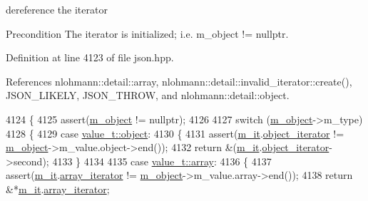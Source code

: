 dereference the iterator 

\begin{DoxyPrecond}{Precondition}
The iterator is initialized; i.\+e. {\ttfamily m\+\_\+object != nullptr}. 
\end{DoxyPrecond}


Definition at line 4123 of file json.\+hpp.



References nlohmann\+::detail\+::array, nlohmann\+::detail\+::invalid\+\_\+iterator\+::create(), J\+S\+O\+N\+\_\+\+L\+I\+K\+E\+LY, J\+S\+O\+N\+\_\+\+T\+H\+R\+OW, and nlohmann\+::detail\+::object.


\begin{DoxyCode}
4124     \{
4125         assert(\hyperlink{classnlohmann_1_1detail_1_1iter__impl_aca84f84be598bdfaaddd23d928c42bbb}{m\_object} != \textcolor{keyword}{nullptr});
4126 
4127         \textcolor{keywordflow}{switch} (\hyperlink{classnlohmann_1_1detail_1_1iter__impl_aca84f84be598bdfaaddd23d928c42bbb}{m\_object}->m\_type)
4128         \{
4129             \textcolor{keywordflow}{case} \hyperlink{namespacenlohmann_1_1detail_a1ed8fc6239da25abcaf681d30ace4985aa8cfde6331bd59eb2ac96f8911c4b666}{value\_t::object}:
4130             \{
4131                 assert(\hyperlink{classnlohmann_1_1detail_1_1iter__impl_a8a86a7c0d4af0cc4ab345b6f0e13cdfa}{m\_it}.\hyperlink{structnlohmann_1_1detail_1_1internal__iterator_a8cb0af3498061426c1d0a65ad6220408}{object\_iterator} != \hyperlink{classnlohmann_1_1detail_1_1iter__impl_aca84f84be598bdfaaddd23d928c42bbb}{m\_object}->m\_value.object->end());
4132                 \textcolor{keywordflow}{return} &(\hyperlink{classnlohmann_1_1detail_1_1iter__impl_a8a86a7c0d4af0cc4ab345b6f0e13cdfa}{m\_it}.\hyperlink{structnlohmann_1_1detail_1_1internal__iterator_a8cb0af3498061426c1d0a65ad6220408}{object\_iterator}->second);
4133             \}
4134 
4135             \textcolor{keywordflow}{case} \hyperlink{namespacenlohmann_1_1detail_a1ed8fc6239da25abcaf681d30ace4985af1f713c9e000f5d3f280adbd124df4f5}{value\_t::array}:
4136             \{
4137                 assert(\hyperlink{classnlohmann_1_1detail_1_1iter__impl_a8a86a7c0d4af0cc4ab345b6f0e13cdfa}{m\_it}.\hyperlink{structnlohmann_1_1detail_1_1internal__iterator_a8294a6e6f01b58e1cce8fbae66a50b5d}{array\_iterator} != \hyperlink{classnlohmann_1_1detail_1_1iter__impl_aca84f84be598bdfaaddd23d928c42bbb}{m\_object}->m\_value.array->end());
4138                 \textcolor{keywordflow}{return} &*\hyperlink{classnlohmann_1_1detail_1_1iter__impl_a8a86a7c0d4af0cc4ab345b6f0e13cdfa}{m\_it}.\hyperlink{structnlohmann_1_1detail_1_1internal__iterator_a8294a6e6f01b58e1cce8fbae66a50b5d}{array\_iterator};

\end{DoxyCode}
